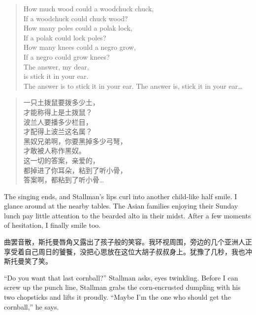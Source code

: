 \ifdefined\eng
\begin{verse}
How much wood could a woodchuck chuck,\\
If a woodchuck could chuck wood?\\
How many poles could a polak lock,\\
If a polak could lock poles?\\
How many knees could a negro grow,\\
If a negro could grow knees?\\
The answer, my dear,\\
is stick it in your ear.\\
\ifdefined\vone
The answer is to stick it in your ear.
\fi
\ifdefined\vtwo
The answer is, stick it in your ear\ldots
\fi
\end{verse}
\fi

\ifdefined\chs
\begin{verse}
一只土拨鼠要拨多少土，\\
才能称得上是土拨鼠？\\
波兰人要播多少栏目，\\
才配得上波兰这名属？\\
黑奴兄弟啊，你要黑掉多少弓弩，\\
才敢被人称作黑奴。\\
这一切的答案，亲爱的，\\
都掉进了你耳朵，粘到了听小骨，\\
答案啊，都粘到了听小骨\ldots
\end{verse}
\fi


\ifdefined\eng
The singing ends, and Stallman's lips curl into another child-like half smile. I glance around at the nearby tables. The Asian families enjoying their Sunday lunch pay little attention to the bearded alto in their midst. After a few moments of hesitation, I finally smile too.
\fi

\ifdefined\chs
曲罢音散，斯托曼唇角又露出了孩子般的笑容。我环视周围，旁边的几个亚洲人正享受着自己周日的饕餮，没把心思放在这位大胡子叔叔身上。犹豫了几秒，我也冲斯托曼笑了笑。
\fi

\ifdefined\eng
``Do you want that last cornball?'' Stallman asks, eyes twinkling. Before I can screw up the punch line, Stallman grabs the corn-encrusted dumpling with his two chopsticks and lifts it proudly. ``Maybe I'm the one who should get the cornball,'' he says.
\fi

